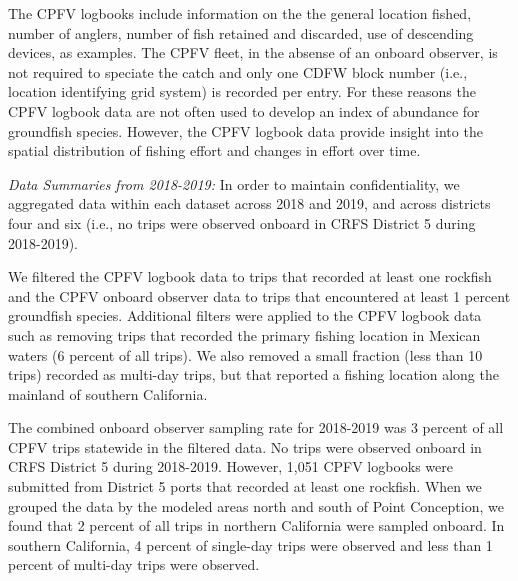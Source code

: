 \documentclass[11pt,
  english,
  letterpaper,
]{article}
\begin{document}
The CPFV logbooks include information on the the general location fished, number of anglers, number of fish retained and discarded, use of descending devices, as examples. The CPFV fleet, in the absense of an onboard observer, is not required to speciate the catch and only one CDFW block number (i.e., location identifying grid system) is recorded per entry. For these reasons the CPFV logbook data are not often used to develop an index of abundance for groundfish species. However, the CPFV logbook data provide insight into the spatial distribution of fishing effort and changes in effort over time.

\emph{Data Summaries from 2018-2019:} In order to maintain confidentiality, we aggregated data within each dataset across 2018 and 2019, and across districts four and six (i.e., no trips were observed onboard in CRFS District 5 during 2018-2019).

We filtered the CPFV logbook data to trips that recorded at least one rockfish and the CPFV onboard observer data to trips that encountered at least 1 percent groundfish species. Additional filters were applied to the CPFV logbook data such as removing trips that recorded the primary fishing location in Mexican waters (6 percent of all trips). We also removed a small fraction (less than 10 trips) recorded as multi-day trips, but that reported a fishing location along the mainland of southern California.

The combined onboard observer sampling rate for 2018-2019 was 3 percent of all CPFV trips statewide in the filtered data. No trips were observed onboard in CRFS District 5 during 2018-2019. However, 1,051 CPFV logbooks were submitted from District 5 ports that recorded at least one rockfish. When we grouped the data by the modeled areas north and south of Point Conception, we found that 2 percent of all trips in northern California were sampled onboard. In southern California, 4 percent of single-day trips were observed and less than 1 percent of multi-day trips were observed.
\end{document}
